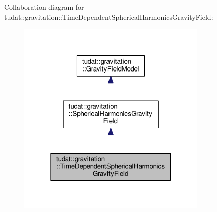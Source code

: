 Collaboration diagram for tudat\+:\+:gravitation\+:\+:Time\+Dependent\+Spherical\+Harmonics\+Gravity\+Field\+:
\nopagebreak
\begin{figure}[H]
\begin{center}
\leavevmode
\includegraphics[width=259pt]{classtudat_1_1gravitation_1_1TimeDependentSphericalHarmonicsGravityField__coll__graph}
\end{center}
\end{figure}
